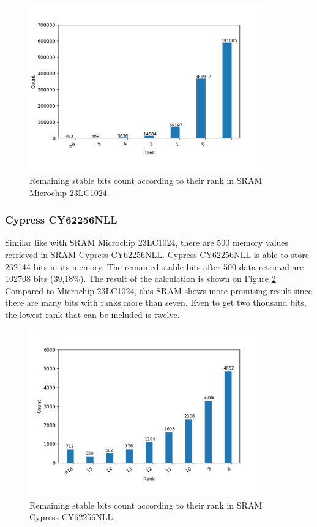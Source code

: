 \begin{figure}[tph!]
    \centerline{\includegraphics[width={0.9\textwidth}]{images/23lc1024_score_rank_bits}}
    \caption{Remaining stable bits count according to their rank in SRAM Microchip 23LC1024.}
    \label{fig:23lc1024_score_rank_bits}
\end{figure}

\subsubsection{Cypress CY62256NLL}
Similar like with SRAM Microchip 23LC1024, there are 500 memory values retrieved in SRAM Cypress CY62256NLL.
Cypress CY62256NLL is able to store 262144 bits in its memory. The remained stable bits after 500 data retrieval are 102708 bits (39,18\%).
The result of the calculation is shown on Figure \ref{fig:cy62256nll_score_rank_bits}. Compared to Microchip 23LC1024, this SRAM shows more promising result since there are many bits with ranks more than seven. Even to get two thousand bits, the lowest rank that can be included is twelve.

\begin{figure}[tph!]
    \centerline{\includegraphics[width={0.9\textwidth}]{images/cy62256nll_score_rank_bits}}
    \caption{Remaining stable bits count according to their rank in SRAM Cypress CY62256NLL.}
    \label{fig:cy62256nll_score_rank_bits}
\end{figure}

